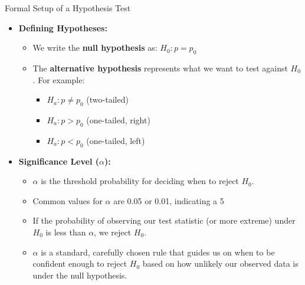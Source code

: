 \documentclass[handout]{beamer} %
\begin{document}
\begin{frame}{Formal Setup of a Hypothesis Test}
    \begin{itemize}
        \item \textbf{Defining Hypotheses:}
        \begin{itemize}
            \item We write the \textbf{null hypothesis} as: \( H_0: p = p_0 \)
            \item The \textbf{alternative hypothesis} represents what we want to test against \( H_0 \). For example:
            \begin{itemize}
                \item \( H_a: p \neq p_0 \) (two-tailed)
                \item \( H_a: p > p_0 \) (one-tailed, right)
                \item \( H_a: p < p_0 \) (one-tailed, left)
            \end{itemize}
        \end{itemize}

        \item \textbf{Significance Level (\( \alpha \)):}
        \begin{itemize}
            \item \( \alpha \) is the threshold probability for deciding when to reject \( H_0 \).
            \item Common values for \( \alpha \) are 0.05 or 0.01, indicating a 5%
            \item If the probability of observing our test statistic (or more extreme) under \( H_0 \) is less than \( \alpha \), we reject \( H_0 \).
            \item \( \alpha \) is a standard, carefully chosen rule that guides us on when to be confident enough to reject \( H_0 \) based on how unlikely our observed data is under the null hypothesis.
        \end{itemize}
    \end{itemize}
\end{frame}
\end{document}
